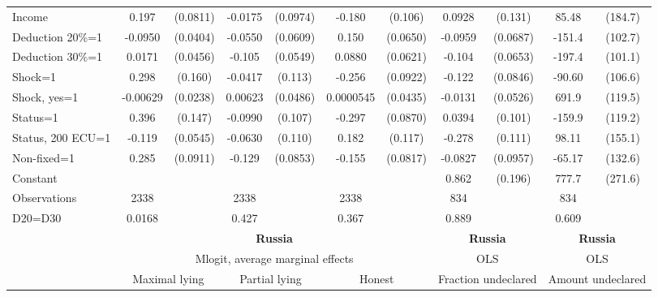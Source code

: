 \begin{tabular}{l|cccccc|cc|cc}
Income          &    0.197\sym{**} & (0.0811)&  -0.0175         & (0.0974)&   -0.180\sym{*}  &  (0.106)&   0.0928         &  (0.131)&    85.48         &  (184.7)\\
Deduction 20\%=1&  -0.0950\sym{**} & (0.0404)&  -0.0550         & (0.0609)&    0.150\sym{**} & (0.0650)&  -0.0959         & (0.0687)&   -151.4         &  (102.7)\\
Deduction 30\%=1&   0.0171         & (0.0456)&   -0.105\sym{*}  & (0.0549)&   0.0880         & (0.0621)&   -0.104         & (0.0653)&   -197.4\sym{*}  &  (101.1)\\
Shock=1         &    0.298\sym{*}  &  (0.160)&  -0.0417         &  (0.113)&   -0.256\sym{***}& (0.0922)&   -0.122         & (0.0846)&   -90.60         &  (106.6)\\
Shock, yes=1    & -0.00629         & (0.0238)&  0.00623         & (0.0486)&0.0000545         & (0.0435)&  -0.0131         & (0.0526)&    691.9\sym{***}&  (119.5)\\
Status=1        &    0.396\sym{***}&  (0.147)&  -0.0990         &  (0.107)&   -0.297\sym{***}& (0.0870)&   0.0394         &  (0.101)&   -159.9         &  (119.2)\\
Status, 200 ECU=1&   -0.119\sym{**} & (0.0545)&  -0.0630         &  (0.110)&    0.182         &  (0.117)&   -0.278\sym{**} &  (0.111)&    98.11         &  (155.1)\\
Non-fixed=1     &    0.285\sym{***}& (0.0911)&   -0.129         & (0.0853)&   -0.155\sym{*}  & (0.0817)&  -0.0827         & (0.0957)&   -65.17         &  (132.6)\\
Constant        &                  &         &                  &         &                  &         &    0.862\sym{***}&  (0.196)&    777.7\sym{***}&  (271.6)\\
\hline
Observations    &     2338         &         &     2338         &         &     2338         &         &      834         &         &      834         &         \\
D20=D30         &   0.0168         &         &    0.427         &         &    0.367         &         &    0.889         &         &    0.609         &         \\
\hline\hline
&\multicolumn{6}{c|}{\bf Russia}&\multicolumn{2}{c|}{\bf Russia}&\multicolumn{2}{c}{\bf Russia}\\ &\multicolumn{6}{c|}{Mlogit, average marginal effects }&\multicolumn{2}{c|}{OLS}&\multicolumn{2}{c}{OLS}\\
                &\multicolumn{2}{c}{Maximal lying}&\multicolumn{2}{c}{Partial lying}&\multicolumn{2}{c}{Honest}  &\multicolumn{2}{c}{Fraction undeclared}&\multicolumn{2}{c}{Amount undeclared}\\

\end{tabular}
